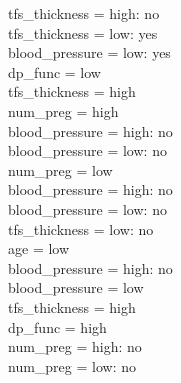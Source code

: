 \documentclass[12pt]{article}
\begin{document}
\textbar\quad \textbar\quad \textbar\quad \textbar\quad \textbar\quad \textbar\quad \textbar\quad tfs\_thickness = high: no\\
\textbar\quad \textbar\quad \textbar\quad \textbar\quad \textbar\quad \textbar\quad \textbar\quad tfs\_thickness = low: yes\\
\textbar\quad \textbar\quad \textbar\quad \textbar\quad \textbar\quad blood\_pressure = low: yes\\
\textbar\quad \textbar\quad \textbar\quad \textbar\quad dp\_func = low\\
\textbar\quad \textbar\quad \textbar\quad \textbar\quad \textbar\quad tfs\_thickness = high\\
\textbar\quad \textbar\quad \textbar\quad \textbar\quad \textbar\quad \textbar\quad num\_preg = high\\
\textbar\quad \textbar\quad \textbar\quad \textbar\quad \textbar\quad \textbar\quad \textbar\quad blood\_pressure = high: no\\
\textbar\quad \textbar\quad \textbar\quad \textbar\quad \textbar\quad \textbar\quad \textbar\quad blood\_pressure = low: no\\
\textbar\quad \textbar\quad \textbar\quad \textbar\quad \textbar\quad \textbar\quad num\_preg = low\\
\textbar\quad \textbar\quad \textbar\quad \textbar\quad \textbar\quad \textbar\quad \textbar\quad blood\_pressure = high: no\\
\textbar\quad \textbar\quad \textbar\quad \textbar\quad \textbar\quad \textbar\quad \textbar\quad blood\_pressure = low: no\\
\textbar\quad \textbar\quad \textbar\quad \textbar\quad \textbar\quad tfs\_thickness = low: no\\
\textbar\quad \textbar\quad \textbar\quad age = low\\
\textbar\quad \textbar\quad \textbar\quad \textbar\quad blood\_pressure = high: no\\
\textbar\quad \textbar\quad \textbar\quad \textbar\quad blood\_pressure = low\\
\textbar\quad \textbar\quad \textbar\quad \textbar\quad \textbar\quad tfs\_thickness = high\\
\textbar\quad \textbar\quad \textbar\quad \textbar\quad \textbar\quad \textbar\quad dp\_func = high\\
\textbar\quad \textbar\quad \textbar\quad \textbar\quad \textbar\quad \textbar\quad \textbar\quad num\_preg = high: no\\
\textbar\quad \textbar\quad \textbar\quad \textbar\quad \textbar\quad \textbar\quad \textbar\quad num\_preg = low: no\\
\end{document}
